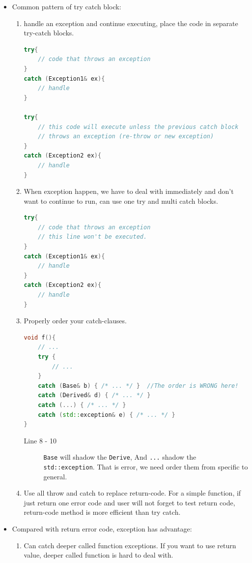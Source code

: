 \documentclass[a4paper,11pt,twoside]{book}
\begin{document}
\begin{itemize}
\item Common pattern of try catch block:
\begin{enumerate}
	 \item handle an exception and continue executing, place the code in separate try-catch blocks. 

\begin{lstlisting}[frame=single, language=c++]
try{ 
	// code that throws an exception	
}
catch (Exception1& ex){
	// handle
}

try{ 
	// this code will execute unless the previous catch block 
	// throws an exception (re-throw or new exception) 
}
catch (Exception2 ex){
	// handle
}		
\end{lstlisting}

	\item When exception happen, we have to deal with immediately and don't want to continue to run, can use one try and multi catch blocks. 
\begin{lstlisting}[frame=single, language=c++]
try{ 
	// code that throws an exception	
	// this line won't be executed. 
}
catch (Exception1& ex){
	// handle
}
catch (Exception2 ex){
	// handle
}			
\end{lstlisting}	
	
	
	\item Properly order your catch-clauses.
\begin{lstlisting}[frame=single, language=c++]
void f(){
	// ...
	try {
		// ...
	}
	catch (Base& b) { /* ... */ }  //The order is WRONG here!
	catch (Derived& d) { /* ... */ }
	catch (...) { /* ... */ }
	catch (std::exception& e) { /* ... */ }
}
\end{lstlisting}	
\begin{description}
	\item[Line 8 - 10] \texttt{Base} will shadow the \texttt{Derive}, And \texttt{...} shadow the \texttt{std::exception}. That is error, we need order them from specific to general. 
\end{description}

	\item Use all throw and catch to replace return-code. For a simple function, if just return one error code and user will not forget to test return code, return-code method is more efficient than try catch. 
\end{enumerate}
	
	\item Compared with return error code, exception has advantage:
	\begin{enumerate}
		\item  Can catch deeper called function exceptions. If you want to use return value, deeper called function is hard to deal with.
		

\end{enumerate}
\end{itemize}
\end{document}
